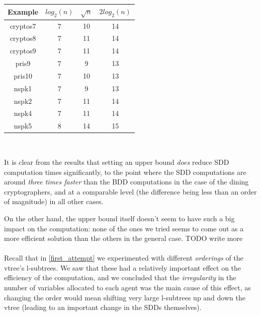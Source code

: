 \documentclass[11pt]{report}
\begin{document}
{\centering
\begin{tabular}{*{3}{c|}c}
Example & $log_2(n)$ & $\sqrt{n}$ & $2log_2(n)$  \\
\hline
cryptos7 & 7 & 10 & 14   \\
cryptos8 & 7 & 11& 14 \\
cryptos9 & 7& 11 & 14  \\
pris9 & 7& 9 & 13   \\
pris10 & 7& 10 & 13   \\
nspk1 & 7& 9 & 13   \\
nspk2 & 7& 11 & 14  \\
nspk4 & 7& 11 & 14   \\
nspk5 & 8& 14 & 15   \\
\end{tabular}
\\\vspace{0.5in}}

\noindent It is clear from the results that setting an upper bound \textit{does} reduce SDD computation times significantly, to the point where the SDD computations are around \textit{three times faster} than the BDD computations in the case of the dining cryptographers, and at a comparable level (the difference being less than an order of magnitude) in all other cases. 

On the other hand, the upper bound itself doesn't seem to have such a big impact on the computation: none of the ones we tried seems to come out as a more efficient solution than the others in the general case. TODO write more
\\\\

Recall that in \ref{first_attempt} we experimented with different \textit{orderings }of the vtree's l-subtrees. We saw that these had a relatively important effect on the efficiency of the computation, and we concluded that the \textit{irregularity} in the number of variables allocated to each agent was the main cause of this effect, as changing the order would mean shifting very large l-subtrees up and down the vtree (leading to an important change in the SDDs themselves). 
\end{document}

